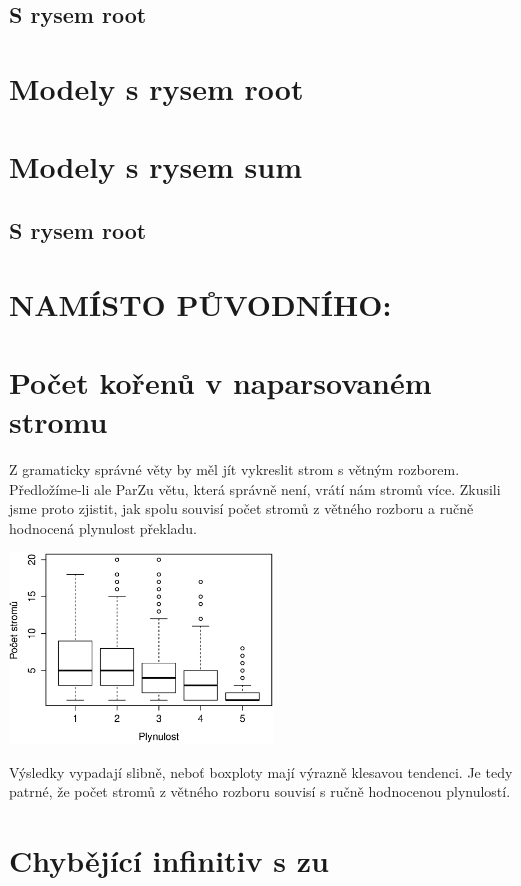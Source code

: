 \documentclass[12pt,a4paper]{report}
\begin{document}
\subsection{S rysem root}
\section{Modely s rysem root}
\section{Modely s rysem sum}
\subsection{S rysem root}

\section{NAMÍSTO PŮVODNÍHO:}

\section{Počet kořenů v naparsovaném stromu}
Z gramaticky správné věty by měl jít vykreslit strom s větným rozborem. Předložíme-li ale ParZu větu, která správně není, vrátí nám stromů více.
Zkusili jsme proto zjistit, jak spolu souvisí počet stromů z větného rozboru a ručně hodnocená plynulost překladu.
\begin{center}
	\includegraphics[width=70mm]{./grafy/pocet-stromu/pocet-stromu.eps}
\end{center}
Výsledky vypadají slibně, neboť boxploty mají výrazně klesavou tendenci. Je tedy patrné, že počet stromů z větného rozboru souvisí s ručně hodnocenou plynulostí.

\section{Chybějící infinitiv s zu}
\end{document}
